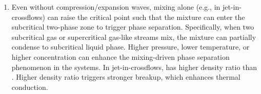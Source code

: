 \begin{enumerate}
    \item Even without compression/expansion waves, mixing alone (e.g., in jet-in-crossflows) can raise the critical point such that the mixture can enter the subcritical two-phase zone to trigger phase separation. Specifically, when two subcritical gas or supercritical gas-like streams mix, the mixture can partially condense to subcritical liquid phase.
    Higher pressure, lower temperature, or higher  concentration can enhance the mixing-driven phase separation phenomenon in the  systems. In jet-in-crossflows,  has higher density ratio than . Higher density ratio triggers stronger breakup, which enhances thermal conduction. 
    



\end{enumerate}
